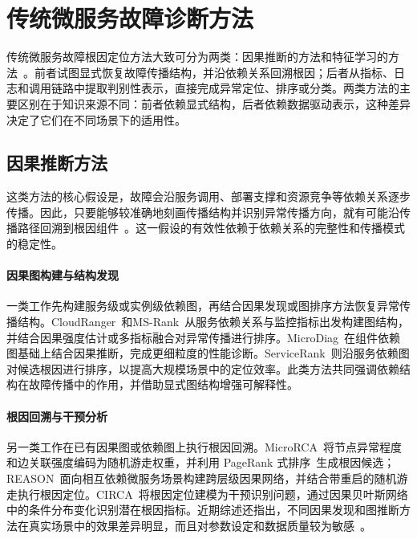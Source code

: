 
\section{传统微服务故障诊断方法}

传统微服务故障根因定位方法大致可分为两类：因果推断的方法和特征学习的方法~\cite{microservice-diagnosis-survey}。前者试图显式恢复故障传播结构，并沿依赖关系回溯根因；后者从指标、日志和调用链路中提取判别性表示，直接完成异常定位、排序或分类。两类方法的主要区别在于知识来源不同：前者依赖显式结构，后者依赖数据驱动表示，这种差异决定了它们在不同场景下的适用性。

\subsection{因果推断方法}

这类方法的核心假设是，故障会沿服务调用、部署支撑和资源竞争等依赖关系逐步传播。因此，只要能够较准确地刻画传播结构并识别异常传播方向，就有可能沿传播路径回溯到根因组件~\cite{Pearl2009Causal,Spirtes2000Causation,pham2024causalmicroservicesurvey}。这一假设的有效性依赖于依赖关系的完整性和传播模式的稳定性。

\paragraph{因果图构建与结构发现}
一类工作先构建服务级或实例级依赖图，再结合因果发现或图排序方法恢复异常传播结构。CloudRanger~\cite{Wang2018Cloudranger}和MS-Rank~\cite{Ma2019Ms-rank}从服务依赖关系与监控指标出发构建图结构，并结合因果强度估计或多指标融合对异常传播进行排序。MicroDiag~\cite{Wu2021Microdiag}在组件依赖图基础上结合因果推断，完成更细粒度的性能诊断。ServiceRank~\cite{Ma2021Servicerank}则沿服务依赖图对候选根因进行排序，以提高大规模场景中的定位效率。此类方法共同强调依赖结构在故障传播中的作用，并借助显式图结构增强可解释性。

\paragraph{根因回溯与干预分析}
另一类工作在已有因果图或依赖图上执行根因回溯。MicroRCA~\cite{wu2020microrca}将节点异常程度和边关联强度编码为随机游走权重，并利用 PageRank 式排序~\cite{pagerank-page1999}生成根因候选；REASON~\cite{Wang2023Interdependent}面向相互依赖微服务场景构建跨层级因果网络，并结合带重启的随机游走执行根因定位。CIRCA~\cite{Li2022Causal}将根因定位建模为干预识别问题，通过因果贝叶斯网络中的条件分布变化识别潜在根因指标。近期综述还指出，不同因果发现和图推断方法在真实场景中的效果差异明显，而且对参数设定和数据质量较为敏感~\cite{pham2024causalmicroservicesurvey}。

